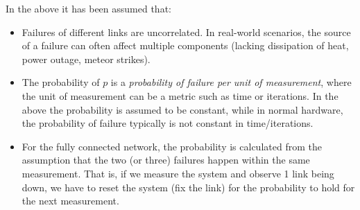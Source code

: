 \documentclass[12pt]{article}
\begin{document}
In the above it has been assumed that:
\begin{itemize}
  \item Failures of different links are uncorrelated. In real-world scenarios, the source of a failure can often affect multiple components (lacking dissipation of heat, power outage, meteor strikes).
  \item The probability of $p$ is a \emph{probability of failure per unit of measurement}, where the unit of measurement can be a metric such as time or iterations. In the above the probability is assumed to be constant, while in normal hardware, the probability of failure typically is not constant in time/iterations.
  \item For the fully connected network, the probability is calculated from the assumption that the two (or three) failures happen within the same measurement. That is, if we measure the system and observe 1 link being down, we have to reset the system (fix the link) for the probability to hold for the next measurement.
\end{itemize}
\end{document}
